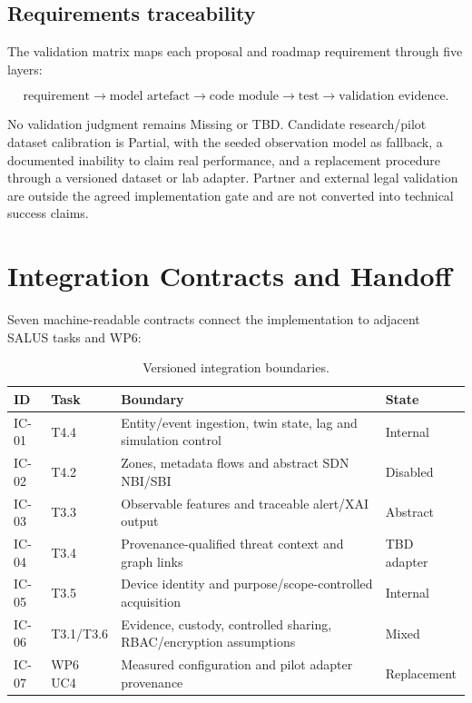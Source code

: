 ﻿\documentclass[11pt,a4paper]{article}
\begin{document}
\subsection{Requirements traceability}

The validation matrix maps each proposal and roadmap requirement through five layers:

\begin{equation}
\text{requirement}\rightarrow\text{model artefact}\rightarrow\text{code module}\rightarrow\text{test}\rightarrow\text{validation evidence}.
\end{equation}

No validation judgment remains Missing or TBD. Candidate research/pilot dataset calibration is Partial, with the seeded observation model as fallback, a documented inability to claim real performance, and a replacement procedure through a versioned dataset or lab adapter. Partner and external legal validation are outside the agreed implementation gate and are not converted into technical success claims.

\section{Integration Contracts and Handoff}

Seven machine-readable contracts connect the implementation to adjacent SALUS tasks and WP6:

\begin{table}[H]
\centering
\caption{Versioned integration boundaries.}
\begin{tabularx}{\textwidth}{@{}l l X l@{}}
\toprule
ID & Task & Boundary & State \\
\midrule
IC-01 & T4.4 & Entity/event ingestion, twin state, lag and simulation control & Internal \\
IC-02 & T4.2 & Zones, metadata flows and abstract SDN NBI/SBI & Disabled \\
IC-03 & T3.3 & Observable features and traceable alert/XAI output & Abstract \\
IC-04 & T3.4 & Provenance-qualified threat context and graph links & TBD adapter \\
IC-05 & T3.5 & Device identity and purpose/scope-controlled acquisition & Internal \\
IC-06 & T3.1/T3.6 & Evidence, custody, controlled sharing, RBAC/encryption assumptions & Mixed \\
IC-07 & WP6 UC4 & Measured configuration and pilot adapter provenance & Replacement \\
\bottomrule
\end{tabularx}
\end{table}
\end{document}
